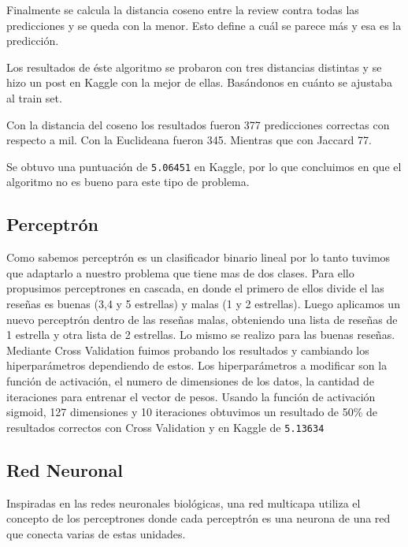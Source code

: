 \documentclass[10pt,a4paper]{article}
\begin{document}
Finalmente se calcula la distancia coseno entre la review contra todas las predicciones y se queda con la menor. Esto define a cuál se parece más y esa es la predicción.


Los resultados de éste algoritmo se probaron con tres distancias distintas y se hizo un post en Kaggle con la mejor de ellas. Basándonos en cuánto se ajustaba al train set.

Con la distancia del coseno los resultados fueron 377 predicciones correctas con respecto a mil. Con la Euclideana fueron 345. Mientras que con Jaccard 77.

Se obtuvo una puntuación de \texttt{5.06451} en Kaggle, por lo que concluimos en que el algoritmo no es bueno para este tipo de problema.


\subsection{Perceptrón}
Como sabemos perceptrón es un clasificador binario lineal por lo tanto tuvimos que adaptarlo a nuestro problema que tiene mas de dos clases. Para ello propusimos perceptrones en cascada, en donde el primero de ellos divide el las reseñas es buenas (3,4 y 5 estrellas) y malas (1 y 2 estrellas). Luego aplicamos un nuevo perceptrón dentro de las reseñas malas, obteniendo una lista de reseñas de 1 estrella y otra lista de 2 estrellas. Lo mismo se realizo para las buenas reseñas. 
Mediante Cross Validation fuimos probando los resultados y cambiando los hiperparámetros dependiendo de estos. Los hiperparámetros a modificar son la función de activación, el numero de dimensiones de los datos, la cantidad de iteraciones para entrenar el vector de pesos. 
Usando la función de activación sigmoid, 127 dimensiones y 10 iteraciones obtuvimos un resultado de 50\% de resultados correctos con Cross Validation y en Kaggle de \texttt{5.13634}


\subsection{Red Neuronal}
Inspiradas en las redes neuronales biológicas, una red multicapa utiliza el concepto de los perceptrones donde cada perceptrón es una neurona de una red que conecta varias de estas unidades.
\end{document}
